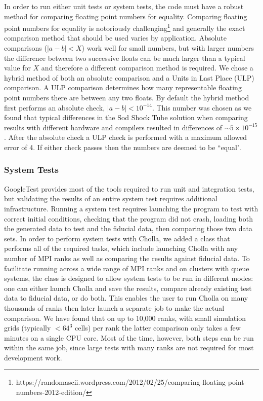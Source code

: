 \documentclass[modern, linenumbers]{aastex631}
\begin{document}
In order to run either unit tests or system tests, the code must have a robust method for comparing floating point numbers for equality. Comparing floating point numbers for equality is notoriously challenging\footnote{https://randomascii.wordpress.com/2012/02/25/comparing-floating-point-numbers-2012-edition/} and generally the exact comparison method that should be used varies by application. Absolute comparisons ($|a-b| < X$) work well for small numbers, but with larger numbers the difference between two successive floats can be much larger than a typical value for $X$ and therefore a different comparison method is required. We chose a hybrid method of both an absolute comparison and a Units in Last Place (ULP) comparison. A ULP comparison determines how many representable floating point numbers there are between any two floats. By default the hybrid method first performs an absolute check, $|a-b| < 10^{-14}$. This number was chosen as we found that typical differences in the Sod Shock Tube solution when comparing results with different hardware and compilers resulted in differences of $\sim5\times10^{-15}$. After the absolute check a ULP check is performed with a maximum allowed error of 4. If either check passes then the numbers are deemed to be ``equal".

\subsubsection{System Tests}

GoogleTest provides most of the tools required to run unit and integration tests, but validating the results of an entire system test requires additional infrastructure. Running a system test requires launching the program to test with correct initial conditions, checking that the program did not crash, loading both the generated data to test and the fiducial data, then comparing those two data sets. In order to perform system tests with Cholla, we added a class that performs all of the required tasks, which include launching Cholla with any number of MPI ranks as well as comparing the results against fiducial data. To facilitate running across a wide range of MPI ranks and on clusters with queue systems, the class is designed to allow system tests to be run in different modes: one can either launch Cholla and save the results, compare already existing test data to fiducial data, or do both. This enables the user to run Cholla on many thousands of ranks then later launch a separate job to make the actual comparison. We have found that on up to 10,000 ranks, with small simulation grids (typically $<64^3$ cells) per rank the latter comparison only takes a few minutes on a single CPU core. Most of the time, however, both steps can be run within the same job, since large tests with many ranks are not required for most development work.
\end{document}
